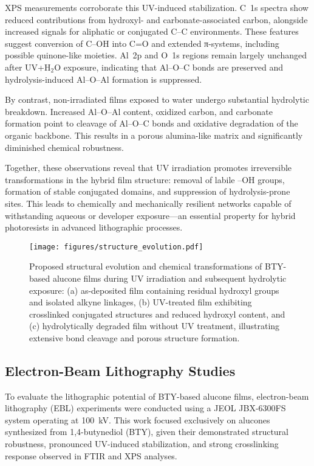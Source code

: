 XPS measurements corroborate this UV-induced stabilization. C~1s spectra show reduced contributions from hydroxyl- and carbonate-associated carbon, alongside increased signals for aliphatic or conjugated C–C environments. These features suggest conversion of C–OH into C=O and extended π-systems, including possible quinone-like moieties. Al~2p and O~1s regions remain largely unchanged after UV+H$_2$O exposure, indicating that Al–O–C bonds are preserved and hydrolysis-induced Al–O–Al formation is suppressed.

By contrast, non-irradiated films exposed to water undergo substantial hydrolytic breakdown. Increased Al–O–Al content, oxidized carbon, and carbonate formation point to cleavage of Al–O–C bonds and oxidative degradation of the organic backbone. This results in a porous alumina-like matrix and significantly diminished chemical robustness.

Together, these observations reveal that UV irradiation promotes irreversible transformations in the hybrid film structure: removal of labile –OH groups, formation of stable conjugated domains, and suppression of hydrolysis-prone sites. This leads to chemically and mechanically resilient networks capable of withstanding aqueous or developer exposure—an essential property for hybrid photoresists in advanced lithographic processes.

\begin{figure}[ht]
  \centering
  \texttt{[image: figures/structure\_evolution.pdf]}
  \caption{Proposed structural evolution and chemical transformations of BTY-based alucone films during UV irradiation and subsequent hydrolytic exposure: (a) as-deposited film containing residual hydroxyl groups and isolated alkyne linkages, (b) UV-treated film exhibiting crosslinked conjugated structures and reduced hydroxyl content, and (c) hydrolytically degraded film without UV treatment, illustrating extensive bond cleavage and porous structure formation.}
  \label{fig:structure_evolution}
\end{figure}



\subsection{Electron-Beam Lithography Studies}

To evaluate the lithographic potential of BTY-based alucone films, electron-beam lithography (EBL) experiments were conducted using a JEOL JBX-6300FS system operating at \SI{100}{\kilo\volt}. This work focused exclusively on alucones synthesized from 1,4-butynediol (BTY), given their demonstrated structural robustness, pronounced UV-induced stabilization, and strong crosslinking response observed in FTIR and XPS analyses.

